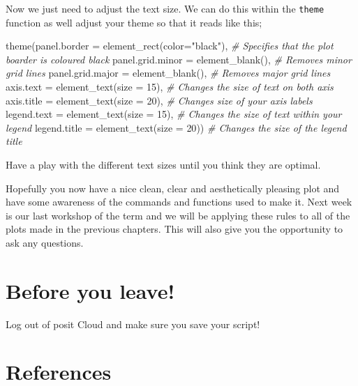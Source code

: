 \documentclass[
]{book}
\newenvironment{Shaded}{\begin{snugshade}}{\end{snugshade}}
\newcommand{\AttributeTok}[1]{\textcolor[rgb]{0.77,0.63,0.00}{#1}}
\newcommand{\CommentTok}[1]{\textcolor[rgb]{0.56,0.35,0.01}{\textit{#1}}}
\newcommand{\DecValTok}[1]{\textcolor[rgb]{0.00,0.00,0.81}{#1}}
\newcommand{\FunctionTok}[1]{\textcolor[rgb]{0.00,0.00,0.00}{#1}}
\newcommand{\NormalTok}[1]{#1}
\newcommand{\StringTok}[1]{\textcolor[rgb]{0.31,0.60,0.02}{#1}}
\begin{document}
Now we just need to adjust the text size. We can do this within the \texttt{theme} function as well adjust your theme so that it reads like this;

\begin{Shaded}
\begin{Highlighting}[]
\FunctionTok{theme}\NormalTok{(}\AttributeTok{panel.border =} \FunctionTok{element\_rect}\NormalTok{(}\AttributeTok{color=}\StringTok{"black"}\NormalTok{), }\CommentTok{\# Specifies that the plot boarder is coloured black}
        \AttributeTok{panel.grid.minor =} \FunctionTok{element\_blank}\NormalTok{(), }\CommentTok{\# Removes minor grid lines }
        \AttributeTok{panel.grid.major =} \FunctionTok{element\_blank}\NormalTok{(), }\CommentTok{\# Removes major grid lines }
        \AttributeTok{axis.text =} \FunctionTok{element\_text}\NormalTok{(}\AttributeTok{size =} \DecValTok{15}\NormalTok{), }\CommentTok{\# Changes the size of text on both axis }
        \AttributeTok{axis.title =} \FunctionTok{element\_text}\NormalTok{(}\AttributeTok{size =} \DecValTok{20}\NormalTok{), }\CommentTok{\# Changes size of your axis labels }
        \AttributeTok{legend.text =} \FunctionTok{element\_text}\NormalTok{(}\AttributeTok{size =} \DecValTok{15}\NormalTok{), }\CommentTok{\# Changes the size of text within your legend}
        \AttributeTok{legend.title =} \FunctionTok{element\_text}\NormalTok{(}\AttributeTok{size =} \DecValTok{20}\NormalTok{)) }\CommentTok{\# Changes the size of the legend title}
\end{Highlighting}
\end{Shaded}

Have a play with the different text sizes until you think they are optimal.

Hopefully you now have a nice clean, clear and aesthetically pleasing plot and have some awareness of the commands and functions used to make it. Next week is our last workshop of the term and we will be applying these rules to all of the plots made in the previous chapters. This will also give you the opportunity to ask any questions.

\hypertarget{before-you-leave-5}{%
\section{Before you leave!}\label{before-you-leave-5}}

Log out of posit Cloud and make sure you save your script!

\hypertarget{references-6}{%
\section{References}\label{references-6}}
\end{document}
